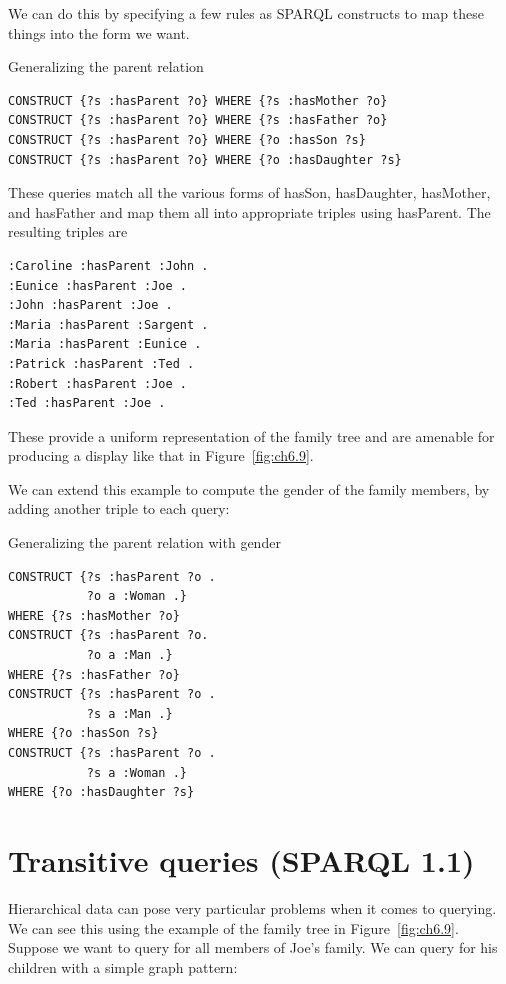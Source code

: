 \begin{challenge}
We can do this by specifying a few rules as SPARQL constructs to map
these things into the form we want.

\begin{query}Generalizing the parent relation\end{query}
\begin{lstlisting}
CONSTRUCT {?s :hasParent ?o} WHERE {?s :hasMother ?o} 
CONSTRUCT {?s :hasParent ?o} WHERE {?s :hasFather ?o} 
CONSTRUCT {?s :hasParent ?o} WHERE {?o :hasSon ?s} 
CONSTRUCT {?s :hasParent ?o} WHERE {?o :hasDaughter ?s}
\end{lstlisting}

These queries match all the various forms of hasSon, hasDaughter,
hasMother, and hasFather and map them all into appropriate triples using
hasParent. The resulting triples are


\begin{lstlisting}
:Caroline :hasParent :John .
:Eunice :hasParent :Joe .
:John :hasParent :Joe .
:Maria :hasParent :Sargent .
:Maria :hasParent :Eunice .
:Patrick :hasParent :Ted .
:Robert :hasParent :Joe .
:Ted :hasParent :Joe .
\end{lstlisting}

These provide a uniform representation of the family tree and are
amenable for producing a display like that in 
Figure~\ref{fig:ch6.9}.

We can extend this example to compute the gender of the family members,
by adding another triple to each query:

\begin{query}Generalizing the parent relation with gender\end{query}
\begin{lstlisting}
CONSTRUCT {?s :hasParent ?o .
           ?o a :Woman .}
WHERE {?s :hasMother ?o} 
CONSTRUCT {?s :hasParent ?o.
           ?o a :Man .} 
WHERE {?s :hasFather ?o} 
CONSTRUCT {?s :hasParent ?o .
           ?s a :Man .} 
WHERE {?o :hasSon ?s} 
CONSTRUCT {?s :hasParent ?o .
           ?s a :Woman .}
WHERE {?o :hasDaughter ?s}
\end{lstlisting}
\end{challenge}

\section{Transitive queries (SPARQL 1.1)}

Hierarchical data can pose very particular problems when it comes to
querying. We can see this using the example of the family tree in Figure~\ref{fig:ch6.9}.
Suppose we want to query for all members of Joe's family. We can
query for his children with a simple graph pattern:

